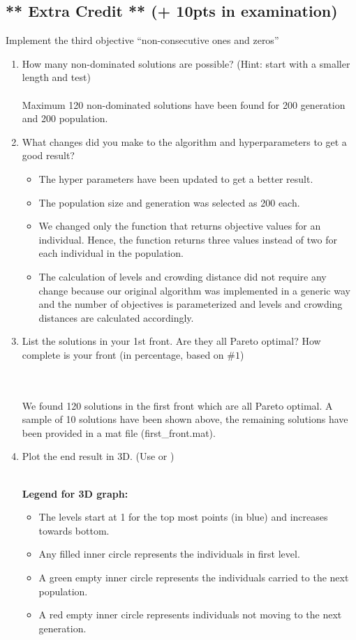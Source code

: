\documentclass{article}
\begin{document}
\subsection{** Extra Credit ** (+ 10pts in examination)}
Implement the third objective ``non-consecutive ones and zeros''
\begin{enumerate}
	\item How many non-dominated solutions are possible? (Hint: start with a smaller length and test)\\ \\
	{\color{blue}Maximum 120 non-dominated solutions have been found for 200 generation and 200 population. }
	\item What changes did you make to the algorithm and hyperparameters to get a good result?
	{\color{blue}
		\begin{itemize}
			\item The hyper parameters have been updated to get a better result. \item The population size and generation was selected as 200 each.
			\item We changed only the function that returns objective values for an individual. Hence, the function returns three values instead of two for each individual in the population.
			\item The calculation of levels and crowding distance did not require any change because our original algorithm was implemented in a generic way and the number of objectives is parameterized and levels and crowding distances are calculated accordingly.
		\end{itemize}
	}
	\item List the solutions in your 1st front. Are they all Pareto optimal? How complete is your front (in percentage, based on $\#1$)
	
	{\color{blue}\\\\
		We found 120 solutions in the first front which are all Pareto optimal. 
		A sample of 10 solutions have been shown above, the remaining solutions have been provided in a mat file (first\_front.mat).
	}
	\item Plot the end result in 3D. (Use  or ) \\ \\ 
	{\color{blue} \textbf{Legend for 3D graph:} 
		\begin{itemize}
			\item The levels start at 1 for the top most points (in blue) and increases towards bottom.
			\item Any filled inner circle represents the individuals in first level.
			\item A green empty inner circle represents the  individuals carried to the next population.
			\item A red empty inner circle represents individuals not moving to the next generation.
		\end{itemize}
	}
	

\end{enumerate}
\end{document}
